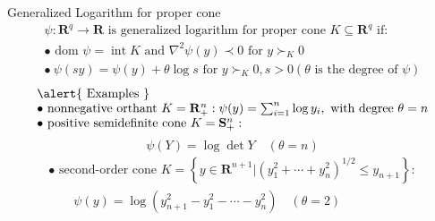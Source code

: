 \documentclass{beamer}
\begin{document}
\begin{frame}[noframenumbering]{Generalized Logarithm for proper cone}
\begin{equation*}
\begin{array}{l}{\psi: \mathbf{R}^{q} \rightarrow \mathbf{R} \text { is generalized logarithm for proper cone } K \subseteq \mathbf{R}^{q} \text { if: }} \\ {\bullet \text { dom } \psi=\operatorname{int} K \text { and } \nabla^{2} \psi(y) \prec 0 \text { for } y \succ_{K} 0} \\ {\bullet \ \psi(s y)=\psi(y)+\theta \log s \text { for } y \succ_{K} 0, s>0(\theta \text { is the degree of } \psi)}\end{array}
\end{equation*}
\begin{equation*}
\begin{array}{l}\alert{\text { {Examples} }} \\ {\bullet \text { nonnegative orthant } K=\mathbf{R}_{+}^{n}: \psi(y)=\sum_{i=1}^{n} \log y_{i}, \text { with degree } \theta=n} \\ {\bullet \text { positive semidefinite cone } K=\mathbf{S}_{+}^{n}:}\end{array}
\end{equation*}
\begin{equation*}
\psi(Y)=\log \operatorname{det} Y \quad(\theta=n)
\end{equation*}
\begin{equation*}
\begin{array}{l}{\bullet \text { second-order cone } K=\left\{y \in \mathbf{R}^{n+1} |\left(y_{1}^{2}+\cdots+y_{n}^{2}\right)^{1 / 2} \leq y_{n+1}\right\}:} \\ {\quad \quad \psi(y)=\log \left(y_{n+1}^{2}-y_{1}^{2}-\cdots-y_{n}^{2}\right) \quad(\theta=2)}\end{array}
\end{equation*}
\end{frame}
\end{document}
